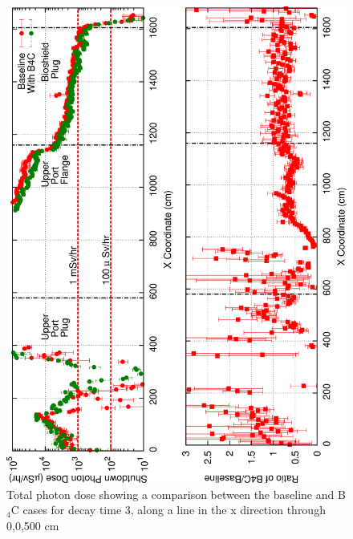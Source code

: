 \documentclass[12pt]{article}
\begin{document}
\begin{figure}[ht!]
\centering
\includegraphics[angle=-90,clip,scale=0.15]{../plots/photon_lineout/dc2_z500_lineout.png}
\caption{Total photon dose showing a comparison between the baseline and B$_4$C cases for decay time 3,
                 along a line in the x direction through 0,0,500 cm}
\label{fig:photons_dc3_total_dose_lineout_z500}
\end{figure}
\end{document}

